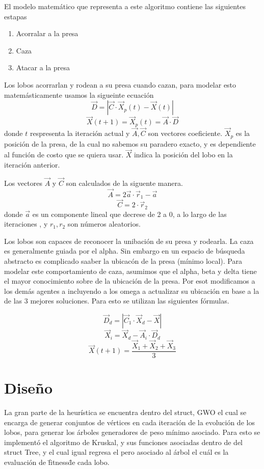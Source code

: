 \documentclass[a4paper]{article}
\begin{document}
El modelo matem\'atico que representa a este algoritmo contiene las siguientes estapas
\begin{enumerate}
\item Acorralar a la presa
\item Caza
\item Atacar a la presa
  \end{enumerate}

  Los lobos acorrarlan y rodean a su presa cuando cazan, para modelar esto matem\'asticamente usamos
  la sigueinte ecuaci\'on
  \[\vec{D} = | \vec{C} \cdot \vec{X}_p(t) - \vec{X}(t)|\]
  \[\vec{X} (t+1) = \vec{X}_p (t) = \vec{A} \cdot \vec{D}\]
  donde $t$ respresenta la iteraci\'on actual y $\vec{A}, \vec{C}$ son vectores coeficiente. $\vec{X}_p$ es la posici\'on de la presa, de la cual no sabemos su paradero exacto, y es dependiente  al funci\'on de costo que se quiera usar. $\vec{X}$ indica la posici\'on del lobo en la iteraci\'on anterior.

Los vectores $\vec{A} $  y $\vec{C} $ son calculados de la siguente manera.
\[\vec{A} = 2 \vec{a} \cdot \vec{r}_1 -\vec{a}\]
\[\vec{C} = 2 \cdot \vec{r}_2\]
donde $\vec{a} $ es un componente lineal que decrese de 2 a 0, a lo largo de las iteraciones , y $r_1, r_2$ son n\'umeros aleatorios.

Los lobos son capaces de reconocer la unibaci\'on de su presa y rodearla. La caza es generalmente
guiada por el alpha. Sin embargo en un espacio de b\'usqueda abstracto es complicado saaber la
ubicac\'on de la presa (m\'inimo local). Para modelar este comportamiento de caza, asumimos que el alpha, beta y delta tiene el mayor conocimiento sobre de la ubicaci\'on de la presa. Por esot modificamos  a los dem\'as agentes a incluyendo a los omega a actualizar su ubicaci\'on en base a la de las 3
mejores soluciones. Para esto se utilizan las siguientes f\'ormulas.

\[\vec{D}_d = |\vec{C}_1\cdot  \vec{X}_d - \vec{X}|\]
\[\vec{X}_i = \vec{X}_d - \vec{A}_i \cdot \vec{D}_d\]
\[\vec{X}(t+1)  = \frac{\vec{X}_1 + \vec{X}_2 + \vec{X}_3}{3}\]


  
\section*{Diseño}

La gran parte de la heur\'istica se encuentra dentro del struct, GWO el cual se encarga de generar
conjuntos de v\'ertices en cada iteraci\'on de la evoluci\'on de los lobos, para generar los
\'arboles generadores de peso m\'inimo asociado. Para esto se implement\'o el algoritmo de Kruskal,
y sus funciones asociadas dentro de del struct Tree, y el cual igual regresa el pero asociado al
\'arbol el cu\'al es la evaluaci\'on de \"fitness\" de cada lobo.
\end{document}
